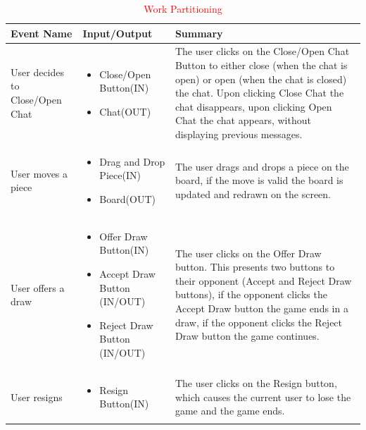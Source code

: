 \documentclass[12pt, titlepage]{article}
\begin{document}
    \begin{table}[!h]
    \centering
     \setlength{\leftmargini}{0.4cm}
    \begin{tabular}{| m{2cm} | m{3cm} |m{10cm} |}
    \hline
    \textbf{Event Name} & \textbf{Input/Output} & \textbf{Summary}
 \\ 
    \hline
		User decides to Close/Open Chat &
		\begin{itemize}
		    \item Close/Open Button(IN)
		    \item Chat(OUT)
		\end{itemize}
		& The user clicks on the Close/Open Chat Button to either close (when the chat is open) or open (when the chat is closed) the chat. Upon clicking Close Chat the chat disappears, upon clicking Open Chat the chat appears, without displaying previous messages.\\
	\hline
	User moves a piece &
	\begin{itemize}
	    \item Drag and Drop Piece(IN)
	    \item Board(OUT)
	\end{itemize}
		& The user drags and drops a piece on the board, if the move is valid the board is updated and redrawn on the screen.\\
	\hline
	User offers a draw &
	\begin{itemize}
	    \item Offer Draw Button(IN)
	    \item Accept Draw Button (IN/OUT)
	    \item Reject Draw Button (IN/OUT)
	\end{itemize}
		& The user clicks on the Offer Draw button. This presents two buttons to
		their opponent (Accept and Reject Draw buttons), if the opponent clicks the Accept Draw button the game ends in a draw, if the opponent clicks the Reject Draw button the game continues. \\
	\hline
	User resigns &
	\begin{itemize}
	    \item Resign Button(IN)
	\end{itemize}
		& The user clicks on the Resign button, which causes the current user to lose the game and the game ends.\\
	\hline
    \end{tabular}
    \caption{\textcolor{red}{
Work Partitioning}}
    \label{Table}
    \end{table}
\FloatBarrier
\end{document}
